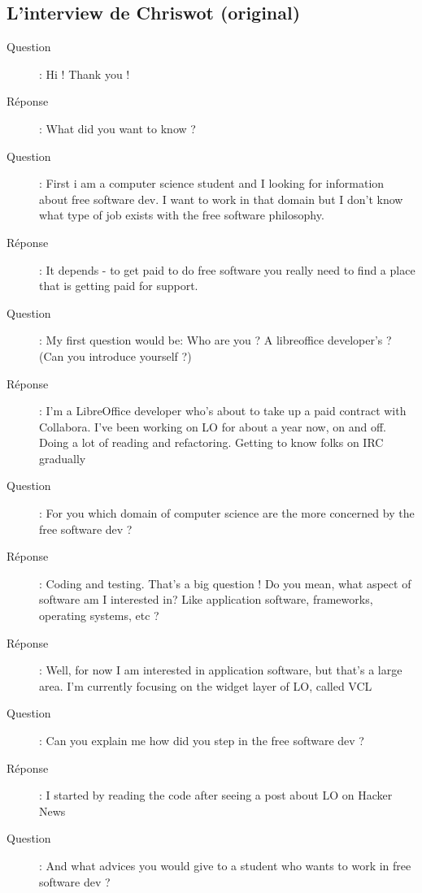 \documentclass[a4paper,12pt, draft]{report}
\begin{document}
\subsection{L'interview de Chriswot (original)}
\begin{description}
\item [Question]:  Hi ! Thank you !
\item [Réponse]:  What did you want to know ?
\item [Question]:  First i am a computer science student and I looking for information about free software dev. I want to work in that domain but I don't know what type of job exists with the free software philosophy.
\item [Réponse]:  It depends - to get paid to do free software you really need to find a place that is getting paid for support.
\item [Question]:  My first question would be: Who are you ? A libreoffice developer's ? (Can you introduce yourself ?)
\item [Réponse]:  I'm a LibreOffice developer who's about to take up a paid contract with Collabora. I've been working on LO for about a year now, on and off. Doing a lot of reading and refactoring. Getting to know folks on IRC gradually
\item [Question]:  For you which domain of computer science are the more concerned by the free software dev ?
\item [Réponse]:  Coding and testing. That's a big question ! Do you mean, what aspect of software am I interested in? Like application software, frameworks, operating systems, etc ?
\item [Réponse]:  Well, for now I am interested in application software, but that's a large area. I'm currently focusing on the widget layer of LO, called VCL
\item [Question]:  Can you explain me how did you step in the free software dev ?
\item [Réponse]:  I started by reading the code after seeing a post about LO on Hacker News
\item [Question]:  And what advices you would give to a student who wants to work in free software dev ?

\end{description}
\end{document}
